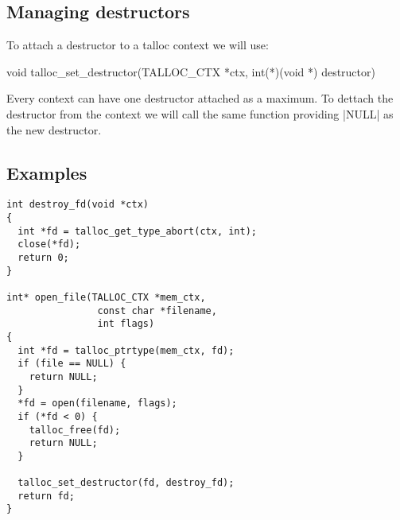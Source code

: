 \subsection{Managing destructors}

To attach a destructor to a talloc context we will use:

\begin{funcproto}
void talloc_set_destructor(TALLOC_CTX *ctx,
                           int(*)(void *) destructor) 
\end{funcproto}
\funclistend
Every context can have one destructor attached as a maximum. To dettach the
destructor from the context we will call the same function providing |NULL| as
the new destructor.

\subsection{Examples}

\begin{lstlisting}[caption={Close a file}]
int destroy_fd(void *ctx)
{
  int *fd = talloc_get_type_abort(ctx, int);
  close(*fd);
  return 0;
}

int* open_file(TALLOC_CTX *mem_ctx,
                const char *filename,
                int flags)
{
  int *fd = talloc_ptrtype(mem_ctx, fd);
  if (file == NULL) {
    return NULL;
  }
  *fd = open(filename, flags);
  if (*fd < 0) {
    talloc_free(fd);
    return NULL;
  }
  
  talloc_set_destructor(fd, destroy_fd);
  return fd;
}
\end{lstlisting}